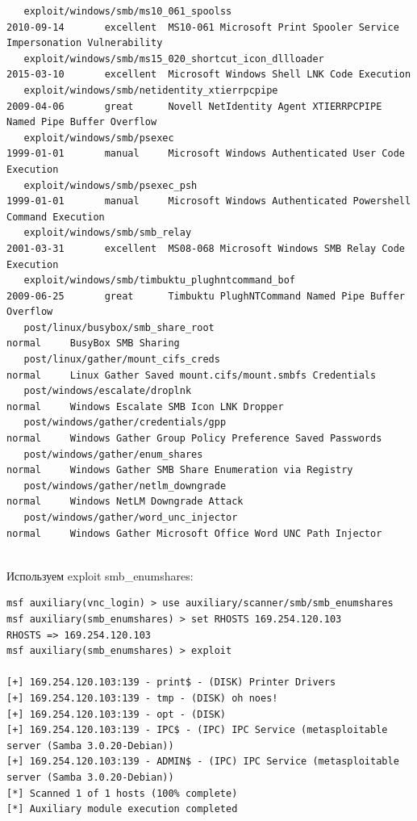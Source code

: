\documentclass[10pt,a4paper]{report}
\begin{document}
\begin{lstlisting}
   exploit/windows/smb/ms10_061_spoolss                            2010-09-14       excellent  MS10-061 Microsoft Print Spooler Service Impersonation Vulnerability
   exploit/windows/smb/ms15_020_shortcut_icon_dllloader            2015-03-10       excellent  Microsoft Windows Shell LNK Code Execution
   exploit/windows/smb/netidentity_xtierrpcpipe                    2009-04-06       great      Novell NetIdentity Agent XTIERRPCPIPE Named Pipe Buffer Overflow
   exploit/windows/smb/psexec                                      1999-01-01       manual     Microsoft Windows Authenticated User Code Execution
   exploit/windows/smb/psexec_psh                                  1999-01-01       manual     Microsoft Windows Authenticated Powershell Command Execution
   exploit/windows/smb/smb_relay                                   2001-03-31       excellent  MS08-068 Microsoft Windows SMB Relay Code Execution
   exploit/windows/smb/timbuktu_plughntcommand_bof                 2009-06-25       great      Timbuktu PlughNTCommand Named Pipe Buffer Overflow
   post/linux/busybox/smb_share_root                                                normal     BusyBox SMB Sharing
   post/linux/gather/mount_cifs_creds                                               normal     Linux Gather Saved mount.cifs/mount.smbfs Credentials
   post/windows/escalate/droplnk                                                    normal     Windows Escalate SMB Icon LNK Dropper
   post/windows/gather/credentials/gpp                                              normal     Windows Gather Group Policy Preference Saved Passwords
   post/windows/gather/enum_shares                                                  normal     Windows Gather SMB Share Enumeration via Registry
   post/windows/gather/netlm_downgrade                                              normal     Windows NetLM Downgrade Attack
   post/windows/gather/word_unc_injector                                            normal     Windows Gather Microsoft Office Word UNC Path Injector


		\end{lstlisting}
		Используем exploit smb\_enumshares:
		
		\begin{lstlisting}
msf auxiliary(vnc_login) > use auxiliary/scanner/smb/smb_enumshares 
msf auxiliary(smb_enumshares) > set RHOSTS 169.254.120.103
RHOSTS => 169.254.120.103
msf auxiliary(smb_enumshares) > exploit

[+] 169.254.120.103:139 - print$ - (DISK) Printer Drivers
[+] 169.254.120.103:139 - tmp - (DISK) oh noes!
[+] 169.254.120.103:139 - opt - (DISK) 
[+] 169.254.120.103:139 - IPC$ - (IPC) IPC Service (metasploitable server (Samba 3.0.20-Debian))
[+] 169.254.120.103:139 - ADMIN$ - (IPC) IPC Service (metasploitable server (Samba 3.0.20-Debian))
[*] Scanned 1 of 1 hosts (100% complete)
[*] Auxiliary module execution completed

		\end{lstlisting}
		
\end{document}
